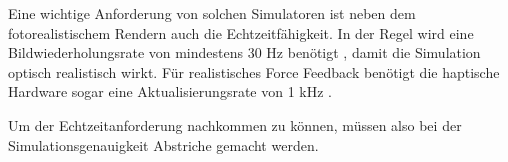 
Eine wichtige Anforderung von solchen Simulatoren ist neben dem fotorealistischem Rendern auch die Echtzeitfähigkeit. In der Regel wird eine Bildwiederholungsrate von mindestens 30 Hz benötigt \cite{SimUpdate}, damit die Simulation optisch realistisch wirkt. 
Für realistisches Force Feedback benötigt die haptische Hardware sogar eine Aktualisierungsrate von 1 kHz \cite{SimUpdate}. 

Um der Echtzeitanforderung nachkommen zu können, müssen also bei der Simulationsgenauigkeit Abstriche gemacht werden. %


